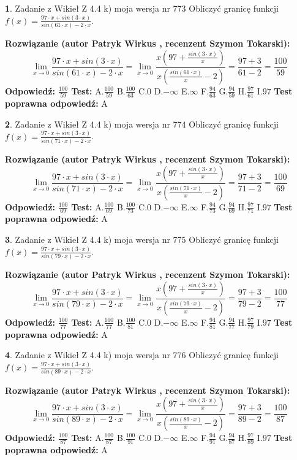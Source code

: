 \documentclass[12pt, a4paper]{article}
\theoremstyle{definition} %
\newtheorem{zad}{}
\newcommand{\zadStart}[1]{\begin{zad}#1\newline}
\newcommand{\zadStop}{\end{zad}}
\newcommand{\rozwStart}[2]{\noindent \textbf{Rozwiązanie (autor #1 , recenzent #2): }\newline}
\newcommand{\rozwStop}{\newline}
\newcommand{\odpStart}{\noindent \textbf{Odpowiedź:}\newline}
\newcommand{\odpStop}{\newline}
\newcommand{\testStart}{\noindent \textbf{Test:}\newline}
\newcommand{\testStop}{\newline}
\newcommand{\kluczStart}{\noindent \textbf{Test poprawna odpowiedź:}\newline}
\newcommand{\kluczStop}{\newline}
\begin{document}
\zadStart{Zadanie z Wikieł Z 4.4 k) moja wersja nr 773}
Obliczyć granicę funkcji $f(x)=\frac{97\cdot x +sin(3\cdot x)}{sin(61\cdot x) -2\cdot x}$.
\zadStop
\rozwStart{Patryk Wirkus}{Szymon Tokarski}
$$\lim\limits_{x\to 0}\frac{97\cdot x +sin(3\cdot x)}{sin(61\cdot x) -2\cdot x}
=\lim\limits_{x\to 0}\frac{x(97+\frac{sin(3\cdot x)}{x})}{x(\frac{sin(61\cdot x)}{x}-2)}
=\frac{97+3}{61-2} = \frac{100}{59}$$
\rozwStop
\odpStart
$\frac{100}{59}$
\odpStop
\testStart
A.$\frac{100}{59}$
B.$\frac{100}{63}$
C.$0$
D.$-\infty$
E.$\infty$
F.$\frac{94}{63}$
G.$\frac{94}{59}$
H.$\frac{97}{61}$
I.$97$
\testStop
\kluczStart
A
\kluczStop



\zadStart{Zadanie z Wikieł Z 4.4 k) moja wersja nr 774}
Obliczyć granicę funkcji $f(x)=\frac{97\cdot x +sin(3\cdot x)}{sin(71\cdot x) -2\cdot x}$.
\zadStop
\rozwStart{Patryk Wirkus}{Szymon Tokarski}
$$\lim\limits_{x\to 0}\frac{97\cdot x +sin(3\cdot x)}{sin(71\cdot x) -2\cdot x}
=\lim\limits_{x\to 0}\frac{x(97+\frac{sin(3\cdot x)}{x})}{x(\frac{sin(71\cdot x)}{x}-2)}
=\frac{97+3}{71-2} = \frac{100}{69}$$
\rozwStop
\odpStart
$\frac{100}{69}$
\odpStop
\testStart
A.$\frac{100}{69}$
B.$\frac{100}{73}$
C.$0$
D.$-\infty$
E.$\infty$
F.$\frac{94}{73}$
G.$\frac{94}{69}$
H.$\frac{97}{71}$
I.$97$
\testStop
\kluczStart
A
\kluczStop



\zadStart{Zadanie z Wikieł Z 4.4 k) moja wersja nr 775}
Obliczyć granicę funkcji $f(x)=\frac{97\cdot x +sin(3\cdot x)}{sin(79\cdot x) -2\cdot x}$.
\zadStop
\rozwStart{Patryk Wirkus}{Szymon Tokarski}
$$\lim\limits_{x\to 0}\frac{97\cdot x +sin(3\cdot x)}{sin(79\cdot x) -2\cdot x}
=\lim\limits_{x\to 0}\frac{x(97+\frac{sin(3\cdot x)}{x})}{x(\frac{sin(79\cdot x)}{x}-2)}
=\frac{97+3}{79-2} = \frac{100}{77}$$
\rozwStop
\odpStart
$\frac{100}{77}$
\odpStop
\testStart
A.$\frac{100}{77}$
B.$\frac{100}{81}$
C.$0$
D.$-\infty$
E.$\infty$
F.$\frac{94}{81}$
G.$\frac{94}{77}$
H.$\frac{97}{79}$
I.$97$
\testStop
\kluczStart
A
\kluczStop



\zadStart{Zadanie z Wikieł Z 4.4 k) moja wersja nr 776}
Obliczyć granicę funkcji $f(x)=\frac{97\cdot x +sin(3\cdot x)}{sin(89\cdot x) -2\cdot x}$.
\zadStop
\rozwStart{Patryk Wirkus}{Szymon Tokarski}
$$\lim\limits_{x\to 0}\frac{97\cdot x +sin(3\cdot x)}{sin(89\cdot x) -2\cdot x}
=\lim\limits_{x\to 0}\frac{x(97+\frac{sin(3\cdot x)}{x})}{x(\frac{sin(89\cdot x)}{x}-2)}
=\frac{97+3}{89-2} = \frac{100}{87}$$
\rozwStop
\odpStart
$\frac{100}{87}$
\odpStop
\testStart
A.$\frac{100}{87}$
B.$\frac{100}{91}$
C.$0$
D.$-\infty$
E.$\infty$
F.$\frac{94}{91}$
G.$\frac{94}{87}$
H.$\frac{97}{89}$
I.$97$
\testStop
\kluczStart
A
\kluczStop
\end{document}
